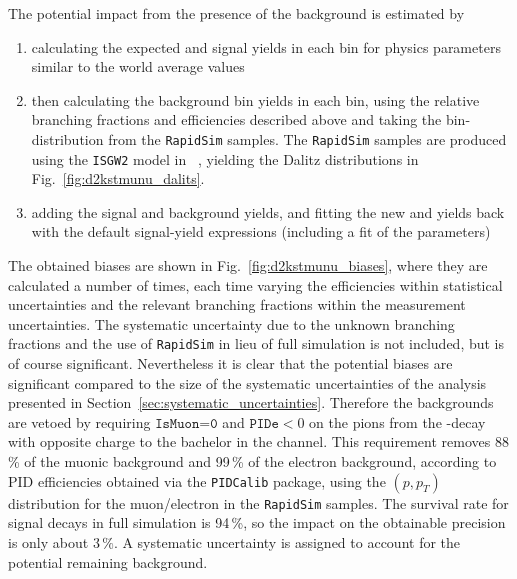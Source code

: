 The potential impact from the presence of the background is estimated by 
\begin{enumerate}
    \item calculating the expected \BtoDpi and \BtoDK signal yields in each bin for physics parameters similar to the world average values
    \item then calculating the background bin yields in each bin, using the relative branching fractions and efficiencies described above and taking the bin-distribution from the \texttt{RapidSim} samples. The \texttt{RapidSim} samples are produced using the \texttt{ISGW2} model in \evtgen~\cite{EvtGen}, yielding the Dalitz distributions in Fig.~\ref{fig:d2kstmunu_dalits}.
    \item adding the signal and background yields, and fitting the new \BtoDpi and \BtoDK yields back with the default signal-yield expressions (including a fit of the \Fi parameters)
\end{enumerate}
The obtained biases are shown in Fig.~\ref{fig:d2kstmunu_biases}, where they are calculated a number of times, each time varying the efficiencies within statistical uncertainties and the relevant branching fractions within the measurement uncertainties. The  systematic uncertainty due to the unknown branching fractions and the use of \texttt{RapidSim} in lieu of full simulation is not included, but is of course significant. Nevertheless it is clear that the potential biases are significant compared to the size of the systematic uncertainties of the analysis presented in Section~\ref{sec:systematic_uncertainties}. Therefore the backgrounds are vetoed by requiring $\texttt{IsMuon=0}$ and $\texttt{PIDe} < 0$ on the pions from the \D-decay with opposite charge to the bachelor in the \DtoKspipi channel. This requirement removes 88\,\% of the muonic background and 99\,\% of the electron background, according to PID efficiencies obtained via the  \texttt{PIDCalib} package, using the $(p, p_T)$ distribution for the muon/electron in the \texttt{RapidSim} samples. The survival rate for signal decays in full simulation is 94\,\%, so the impact on the obtainable precision is only about $3\,\%$. A systematic uncertainty is assigned to account for the potential remaining background.

